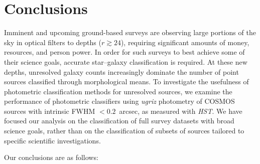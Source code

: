 \documentclass[12pt,preprint]{aastex}
\begin{document}
\section{Conclusions}

Imminent and upcoming ground-based surveys are observing large
portions of the sky in optical filters to depths ($r\gtrsim24$),
requiring significant amounts of money, resources, and person power.
In order for such surveys to best achieve some of their science goals,
accurate star--galaxy classification is required.  At these new
depths, unresolved galaxy counts increasingly dominate the number of
point sources classified through morphological means.  To investigate
the usefulness of photometric classification methods for unresolved
sources, we examine the performance of photometric classifiers using
{\it ugriz} photometry of COSMOS sources with intrinsic FWHM
$<0.2$~arcsec, as measured with {\it HST}.  We have focused our
analysis on the classification of full survey datasets with broad
science goals, rather than on the classification of subsets of sources
tailored to specific scientific investigations.

Our conclusions are as follows:
\end{document}
